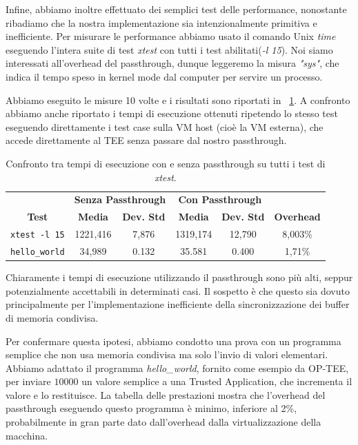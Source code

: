 \documentclass[12pt,italian]{report}
\begin{document}
Infine, abbiamo inoltre effettuato dei semplici test delle performance,
nonostante ribadiamo che la nostra implementazione sia intenzionalmente
primitiva e inefficiente.
Per misurare le performance abbiamo usato il comando Unix \textit{time}
eseguendo l'intera suite di test \textit{xtest} con tutti i test
abilitati(\textit{-l 15}).
Noi siamo interessati all'overhead del passthrough, dunque leggeremo la
misura \textit{"sys"}, che indica il tempo speso in kernel mode dal computer
per servire un processo. 

Abbiamo eseguito le misure 10 volte e i risultati sono riportati
in \tablename~\ref{tab:performance}.
A confronto abbiamo anche riportato i tempi di esecuzione ottenuti ripetendo
lo stesso test eseguendo direttamente i test case sulla VM host
(cioè la VM esterna), che accede direttamente al TEE senza passare dal
nostro passthrough.

\begin{table}[h]
    \centering
    
    \begin{tabular}{cccccc}
    \multicolumn{1}{c|}{}  & \multicolumn{2}{c|}{\textbf{Senza Passthrough}} & \multicolumn{2}{c|}{\textbf{Con Passthrough}} &  \\
    \multicolumn{1}{c|}{\multirow{-2}{*}{\textbf{Test}}} &
      \multicolumn{1}{c|}{\textbf{Media}} &
      \multicolumn{1}{c|}{\textbf{Dev. Std}} &
      \multicolumn{1}{c|}{\textbf{Media}} &
      \multicolumn{1}{c|}{\textbf{Dev. Std}} &
      \multirow{-2}{*}{\textbf{Overhead}} \\ \hline
        \texttt{xtest -l 15}    & 1221,416  & 7,876 & 1319,174 & 12,790 & 8,003\% \\
        \texttt{hello\_world}   & 34,989    & 0.132 & 35.581 & 0.400 & 1,71\% \\
    \end{tabular}
    \caption{
        Confronto tra tempi di esecuzione con e senza passthrough su
        tutti i test di \textit{xtest}.
    }
    \label{tab:performance}
\end{table}

Chiaramente i tempi di esecuzione utilizzando il passthrough sono più alti,
seppur potenzialmente accettabili in determinati casi.
Il sospetto è che questo sia dovuto principalmente per l'implementazione
inefficiente della sincronizzazione dei buffer di memoria condivisa.

Per confermare questa ipotesi, abbiamo condotto una prova con un programma
semplice che non usa memoria condivisa ma solo l'invio di valori elementari.
Abbiamo adattato il programma \textit{hello\_world}, fornito come esempio
da OP-TEE, per inviare $10000$ un valore semplice a una Trusted Application,
che incrementa il valore e lo restituisce.
La tabella delle prestazioni mostra che l'overhead del passthrough eseguendo
questo programma è minimo, inferiore al 2\%, probabilmente in gran parte dato
dall'overhead dalla virtualizzazione della macchina.
\end{document}
